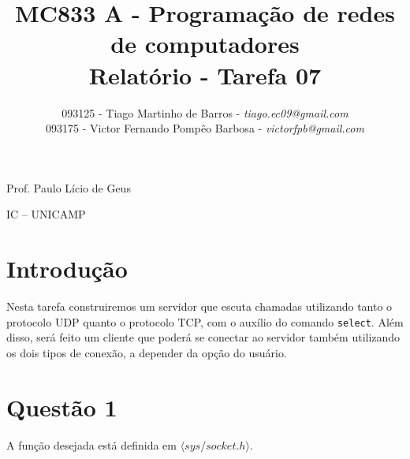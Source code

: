 \documentclass[a4paper,10pt]{article}
\begin{document}


\title{MC833 A - Programação de redes de computadores\\
Relatório - Tarefa 07}

\author {   093125 - Tiago Martinho de Barros - \textit{tiago.ec09@gmail.com}\\
            093175 - Victor Fernando Pompêo Barbosa - \textit{victorfpb@gmail.com}}


\maketitle

\centerline{Prof. Paulo Lício de Geus}
\centerline{IC -- UNICAMP}

\vspace{2cm}
\tableofcontents
    
\newpage
\section*{Introdução}
\hspace{14pt}

    Nesta tarefa construiremos um servidor que escuta chamadas utilizando tanto o protocolo UDP quanto o protocolo TCP, com o auxílio do comando {\tt select}. Além disso, será feito um cliente que poderá se conectar ao servidor também utilizando os dois tipos de conexão, a depender da opção do usuário.

\section{Questão 1}

A função desejada está definida em $\langle sys/socket.h \rangle$.
\end{document}
